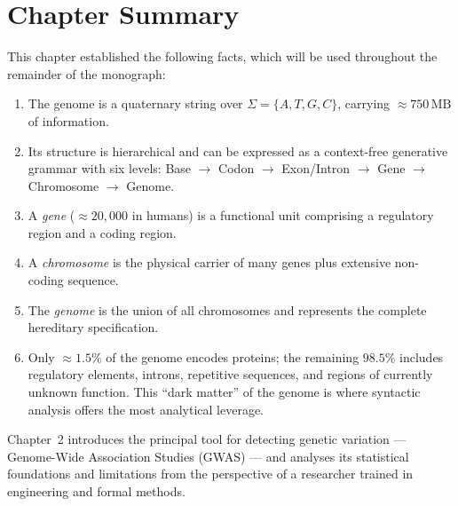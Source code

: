 \documentclass[12pt, a4paper, oneside]{book}
\theoremstyle{definition}
\theoremstyle{remark}
\begin{document}
\section{Chapter Summary}
\label{sec:ch1-summary}

This chapter established the following facts, which will be used
throughout the remainder of the monograph:

\begin{enumerate}
  \item The genome is a quaternary string over $\Sigma = \{A,T,G,C\}$,
        carrying $\approx 750\,\text{MB}$ of information.
  \item Its structure is hierarchical and can be expressed as a
        context-free generative grammar with six levels: Base $\to$
        Codon $\to$ Exon/Intron $\to$ Gene $\to$ Chromosome $\to$ Genome.
  \item A \emph{gene} ($\approx 20{,}000$ in humans) is a functional
        unit comprising a regulatory region and a coding region.
  \item A \emph{chromosome} is the physical carrier of many genes plus
        extensive non-coding sequence.
  \item The \emph{genome} is the union of all chromosomes and represents
        the complete hereditary specification.
  \item Only $\approx 1.5\%$ of the genome encodes proteins; the
        remaining $98.5\%$ includes regulatory elements, introns,
        repetitive sequences, and regions of currently unknown function.
        This ``dark matter'' of the genome is where syntactic analysis
        offers the most analytical leverage.
\end{enumerate}

\noindent
Chapter~2 introduces the principal tool for detecting genetic variation
--- Genome-Wide Association Studies (GWAS) --- and analyses its
statistical foundations and limitations from the perspective of a
researcher trained in engineering and formal methods.

\end{document}
